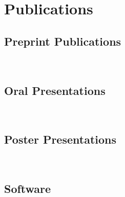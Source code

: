 \documentclass[10pt, letterpaper]{article}
\newcommand{\LastName}{Mishra}
\newcommand{\Initials}{PK}
\newcommand{\Me}{\textbf{\LastName, \Initials}}  %
\newcommand{\DOI}[1]{doi:\href{https://doi.org/#1}{#1}}
\newcommand{\GitHub}[1]{\href{https://github.com/#1}{\faGithub}}
\newcommand{\SlidesDOI}[1]{\href{https://doi.org/#1}{\faTv}}
\newcommand{\Year}[1]{\fontsize{9pt}{0}\selectfont #1}
\begin{document}
\section{Publications}

\subsection{Preprint Publications}
\begin{refsection}
  ~\nocite{*}
  \printbibliography[heading=none, keyword={preprint}]
\end{refsection}

\subsection{Oral Presentations}
\begin{refsection}
  ~\nocite{*}
  \printbibliography[heading=none, keyword={Oral-Presentation}]
\end{refsection}

\subsection{Poster Presentations}
\begin{refsection}
  ~\nocite{*}
  \printbibliography[heading=none, keyword={Poster-Presentation}]
\end{refsection}

\subsection{Software}
\begin{refsection}
  ~\nocite{*}
  \printbibliography[heading=none, keyword={Software}]
\end{refsection}
\end{document}
